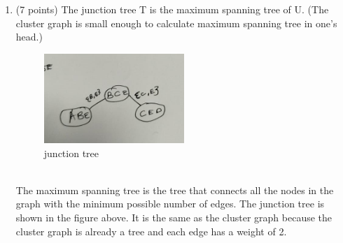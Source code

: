 \documentclass[a3paper,12pt]{extarticle} %
\begin{document}
\begin{enumerate}
\begin{enumerate}
\begin{itemize}
        \end{itemize}
        \item (7 points) The junction tree T is the maximum spanning tree of U.
        (The cluster graph is small enough to calculate maximum spanning tree in one’s head.)
        \begin{figure}[h!]
            \centering
            \includegraphics[width=0.5\textwidth]{maximal_clique.jpg}
            \caption{junction tree}
            \label{fig:example_image}
        \end{figure}
        \\The maximum spanning tree is the tree that connects all the nodes in the graph with the minimum possible number of edges. The junction tree is shown in the figure above. It is the same as the cluster graph because the cluster graph is already a tree and each edge has a weight of 2.
    \end{enumerate}

\end{enumerate}
\newpage
\end{document}
